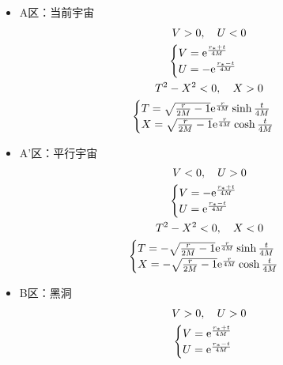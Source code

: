     \begin{itemize}
        \item A区：当前宇宙
        \begin{gather*}
            V>0,\quad U<0
            \\
            \begin{cases}
                V=\mathrm{e}^{\frac{r_{*}+t}{4M}}
                \\
                U=-\mathrm{e}^{\frac{r_{*}-t}{4M}}
            \end{cases}
            \\
            T^2-X^2<0,\quad X>0
            \\
            \begin{cases}
                T=\sqrt{\frac{r}{2M}-1}\mathrm{e}^{\frac{r}{4M}}\sinh \frac{t}{4M}
                \\
                X=\sqrt{\frac{r}{2M}-1}\mathrm{e}^{\frac{r}{4M}}\cosh \frac{t}{4M}
            \end{cases}
        \end{gather*}
        \item A'区：平行宇宙
        \begin{gather*}
            V<0,\quad U>0
            \\
            \begin{cases}
                V=-\mathrm{e}^{\frac{r_{*}+t}{4M}}
                \\
                U=\mathrm{e}^{\frac{r_{*}-t}{4M}}
            \end{cases}
            \\
            T^2-X^2<0,\quad X<0
            \\
            \begin{cases}
                T=-\sqrt{\frac{r}{2M}-1}\mathrm{e}^{\frac{r}{4M}}\sinh \frac{t}{4M}
                \\
                X=-\sqrt{\frac{r}{2M}-1}\mathrm{e}^{\frac{r}{4M}}\cosh \frac{t}{4M}
            \end{cases}
        \end{gather*}
        \item B区：黑洞
        \begin{gather*}
            V>0,\quad U>0
            \\
            \begin{cases}
                V=\e^{\frac{r_{*}+t}{4M}}
                \\
                U=\e^{\frac{r_{*}-t}{4M}}
            \end{cases}

\end{gather*}
\end{itemize}
